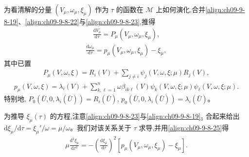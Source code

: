\documentclass[../../main.tex]{subfiles}
\begin{document}
为看清解的分量 $(V_{\mu},\omega_{\mu},\xi_{\mu})$ 作为 $\tau$ 的函数在 $\mathscr{M}$ 上如何演化,合并\eqref{align:ch09-9-8-19}、\eqref{align:ch09-9-8-22}与\eqref{align:ch09-9-8-23},推得
\begin{align}
\frac{\mathrm{d}V_{\mu}}{\mathrm{d}\tau}=P_{\mu}(V_{\mu},\omega_{\mu},\xi_{\mu}),
\label{align:ch09-9-8-24}
\end{align}
\begin{align}
\frac{\mathrm{d}\omega_{\mu}}{\mathrm{d}\tau}=p_{\mu}(V_{\mu},\omega_{\mu},\xi_{\mu})-\xi_{\mu},
\label{align:ch09-9-8-25}
\end{align}
其中已置
\begin{align}
P_{\mu}(V,\omega,\xi)=R_{i}(V)+\sum_{j\neq i}\psi_{j}(V,\omega,\xi;\mu)R_{j}(V),
\label{align:ch09-9-8-26}
\end{align}
\begin{align}
p_{\mu}(V,\omega,\xi)=\lambda_{i}(V)+\sum_{k,\ell=1}^{n}\omega\beta_{ik\ell}(V)\psi_{k}(V,\omega,\xi;\mu)\psi_{\ell}(V,\omega,\xi;\mu).
\label{align:ch09-9-8-27}
\end{align}
特别地, $P_{0}(\bar{U},0,\lambda_{i}(\bar{U}))=R_{i}(\bar{U})$, $p_{0}(\bar{U},0,\lambda_{i}(\bar{U}))=\lambda_{i}(\bar{U})$。

为推导 $\xi_{\mu}(\tau)$ 的方程,注意\eqref{align:ch09-9-8-23}与\eqref{align:ch09-9-8-19}$_{3}$ 合起来给出 $\mathrm{d}\xi_{\mu}/\mathrm{d}\tau=\xi_{\mu}'/\omega=\mu/\omega$。我们对该关系关于 $\tau$ 求导,并用\eqref{align:ch09-9-8-25}得
\begin{align}
\mu\frac{\mathrm{d}^{2}\xi_{\mu}}{\mathrm{d}\tau^{2}}=-\left(\frac{\mathrm{d}\xi_{\mu}}{\mathrm{d}\tau}\right)^{2}[p_{\mu}(V_{\mu},\omega_{\mu},\xi_{\mu})-\xi_{\mu}].
\label{align:ch09-9-8-28}
\end{align}
\end{document}
